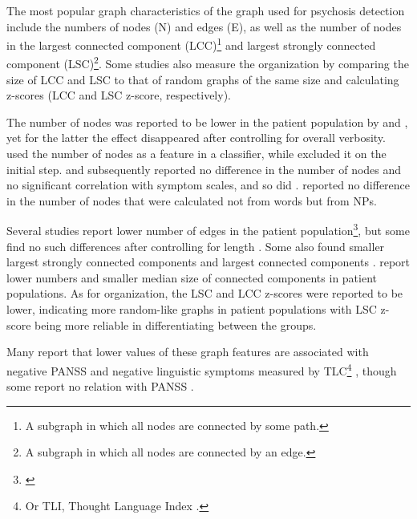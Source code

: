 The most popular graph characteristics of the graph used for psychosis detection include the numbers of nodes (N) and edges (E), as well as the number of nodes in the largest connected component (LCC)\footnote{A subgraph in which all nodes are connected by some path.} and largest strongly connected component (LSC)\footnote{A subgraph in which all nodes are connected by an edge.}. Some studies also measure the organization by comparing the size of LCC and LSC to that of random graphs of the same size and calculating z-scores (LCC and LSC z-score, respectively). 

The number of nodes was reported to be lower in the patient population by \citet{nikzad2022does} and \citet{nettekoven2023semantic}, yet for the latter the effect disappeared after controlling for overall verbosity. \citet{mota2022happy} used the number of nodes as a feature in a classifier, while \citet{tang2023latent} excluded it on the initial step. \citet{mota2012speech} and subsequently \citet{mota2014graph} reported no difference in the number of nodes and no significant correlation with symptom scales, and so did \citet{nettekoven2023semantic}. \citet{palominos2023coreference} reported no difference in the number of nodes that were calculated not from words but from NPs. 

Several studies report lower number of edges in the patient population\footnote{\citet{mota2014graph, mota2016quantifying, mota2017thought, nikzad2022does}}, but some find no such differences after controlling for length \citep{mota2012speech, nettekoven2023semantic}. Some also found smaller largest strongly connected components and largest connected components \citep{mota2014graph, mota2016quantifying, mota2017thought, spencer2021lower, morgan2021natural, nikzad2022does}. \citet{nettekoven2023semantic} report lower numbers and smaller median size of connected components in patient populations. As for organization, the LSC and LCC z-scores were reported to be lower, indicating more random-like graphs in patient populations \citep{mota2016quantifying, mota2017thought, spencer2021lower, morgan2021natural, nikzad2022does} with LSC z-score being more reliable in differentiating between the groups. 

Many report that lower values of these graph features are associated with negative PANSS \citep{mota2014graph, mota2016quantifying, nikzad2022does} and negative linguistic symptoms measured by TLC\footnote{Or TLI, Thought Language Index \citep{liddle2002tli}.}  \citep{morgan2021natural, spencer2021lower, nikzad2022does}, though some report no relation with PANSS \citep{mota2012speech, argolo2023burnishing, nettekoven2023semantic}. 

